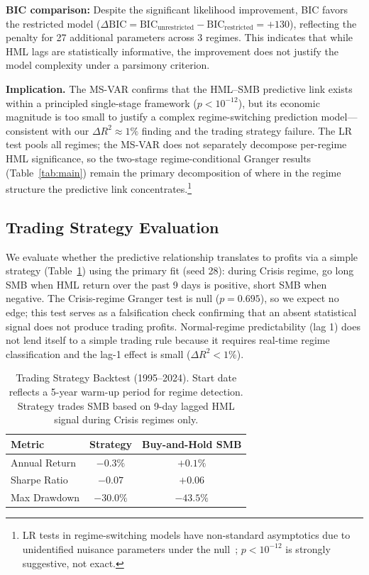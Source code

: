\documentclass[sigconf,anonymous]{acmart}
\begin{document}
\textbf{BIC comparison:} Despite the significant likelihood improvement, BIC favors
the restricted model ($\Delta\text{BIC} = \text{BIC}_{\text{unrestricted}} - \text{BIC}_{\text{restricted}} = +130$),
reflecting the penalty for 27 additional parameters across 3 regimes. This indicates that while HML lags are
statistically informative, the improvement does not justify the model complexity
under a parsimony criterion.

\textbf{Implication.} The MS-VAR confirms that the HML--SMB predictive link exists
within a principled single-stage framework ($p < 10^{-12}$), but its economic magnitude
is too small to justify a complex regime-switching prediction model---consistent with
our $\Delta R^2 \approx 1\%$ finding and the trading strategy failure.
The LR test pools all regimes; the MS-VAR does not separately decompose per-regime HML significance,
so the two-stage regime-conditional Granger results (Table~\ref{tab:main}) remain the primary
decomposition of where in the regime structure the predictive link concentrates.\footnote{LR
tests in regime-switching models have non-standard asymptotics due to unidentified nuisance
parameters under the null~\cite{hansen1992likelihood}; $p < 10^{-12}$ is strongly suggestive,
not exact.}

\subsection{Trading Strategy Evaluation}
\label{sec:trading}

We evaluate whether the predictive relationship translates to profits via a simple
strategy (Table~\ref{tab:trading}) using the primary fit (seed 28): during Crisis regime, go long SMB when HML return over the past 9 days
is positive, short SMB when negative. The Crisis-regime Granger test is
null ($p = 0.695$), so we expect no edge; this test serves as a falsification check
confirming that an absent statistical signal does not produce trading profits.
Normal-regime predictability (lag 1) does not lend itself to a simple trading rule
because it requires real-time regime classification and the lag-1 effect is small ($\Delta R^2 < 1\%$).

\begin{table}[t]
\centering
\caption{Trading Strategy Backtest (1995--2024). Start date reflects a 5-year warm-up period for regime detection. Strategy trades SMB based on 9-day lagged HML signal during Crisis regimes only.}
\label{tab:trading}
\begin{tabular}{lcc}
\toprule
Metric & Strategy & Buy-and-Hold SMB \\
\midrule
Annual Return & $-0.3\%$ & $+0.1\%$ \\
Sharpe Ratio & $-0.07$ & $+0.06$ \\
Max Drawdown & $-30.0\%$ & $-43.5\%$ \\
\bottomrule
\end{tabular}
\end{table}
\end{document}

